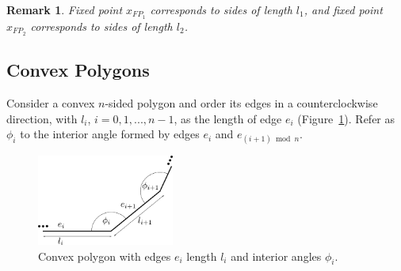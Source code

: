 \documentclass[10pt,a4paper]{article}
\newtheorem{remark}{\bf Remark}
\begin{document}
\begin{remark} \label{rm2}
Fixed point $x_{FP_1}$ corresponds to sides of length $l_1$, and fixed point $x_{FP_2}$ corresponds to sides of length $l_2$.
\end{remark}



\subsection{Convex Polygons}

Consider a convex $n$-sided polygon and order its edges in a counterclockwise direction, with $l_i$, $i=0,1,...,n-1$, as the length of edge $e_i$ (Figure~\ref{fig:convPol}). Refer as $\phi_i$ to the interior angle formed by edges $e_i$ and $e_{(i+1)\bmod n}$. 

\begin{figure}[thpb]
  \centering
  \includegraphics[width=0.4\textwidth]{convPolygon.pdf}
  \caption{Convex polygon with edges $e_i$ length $l_i$ and interior angles $\phi_i$.}
  \label{fig:convPol}
\end{figure}
\end{document}
